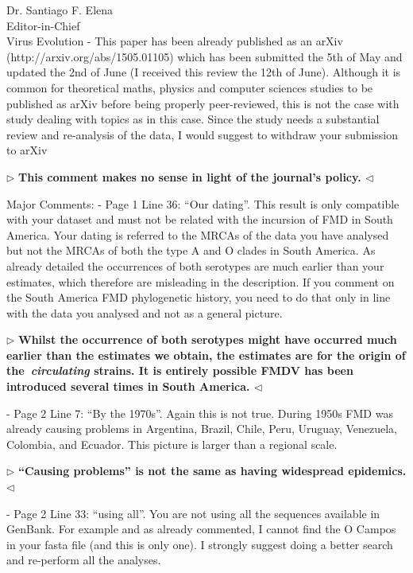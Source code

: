 \documentclass[ucla,biomath,12pt,noaddrfooter,datefrom]{UC_letter}
\newenvironment{reply}{$\triangleright$\bf}{$\triangleleft$}
\begin{document}
\begin{letter}{
Dr. Santiago F. Elena \\
Editor-in-Chief \\
Virus Evolution
}
-       This paper has been already published as an arXiv (http://arxiv.org/abs/1505.01105) which has been submitted the 5th of May and updated the 2nd of June (I received this review the 12th of June). 
Although it is common for theoretical maths, physics and computer sciences studies to be published as arXiv before being properly peer-reviewed, this is not the case with study dealing with topics as in this case. 
Since the study needs a substantial review and re-analysis of the data, I would suggest to withdraw your submission to arXiv

\begin{reply}
This comment makes no sense in light of the journal's policy.
\end{reply}

Major Comments:
-       Page 1 Line 36: ``Our dating''. 
This result is only compatible with your dataset and must not be related with the incursion of FMD in South America. 
Your dating is referred to the MRCAs of the data you have analysed but not the MRCAs of both the type A and O clades in South America. 
As already detailed the occurrences of both serotypes are much earlier than your estimates, which therefore are misleading in the description. 
If you comment on the South America FMD phylogenetic history, you need to do that only in line with the data you analysed and not as a general picture.

\begin{reply}
Whilst the occurrence of both serotypes might have occurred much earlier than the estimates we obtain, the estimates are for the origin of the~\textit{circulating} strains.
It is entirely possible FMDV has been introduced several times in South America.
\end{reply}

-       Page 2 Line 7: ``By the 1970s''. 
Again this is not true. 
During 1950s FMD was already causing problems in Argentina, Brazil, Chile, Peru, Uruguay, Venezuela, Colombia, and Ecuador. 
This picture is larger than a regional scale.

\begin{reply}
``Causing problems'' is not the same as having widespread epidemics.
\end{reply}

-       Page 2 Line 33: ``using all''. 
You are not using all the sequences available in GenBank. 
For example and as already commented, I cannot find the O Campos in your fasta file (and this is only one). 
I strongly suggest doing a better search and re-perform all the analyses.


\end{letter}
\end{document}
